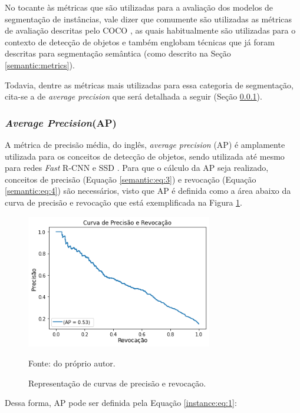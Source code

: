 No tocante às métricas que são utilizadas para a avaliação dos modelos de segmentação de instâncias, vale dizer que comumente são utilizadas as métricas de avaliação descritas pelo COCO \cite{Lin2016}, as quais habitualmente são utilizadas para o contexto de detecção de objetos e também englobam técnicas que já foram descritas para segmentação semântica (como descrito na Seção \ref{semantic:metrics}).

Todavia, dentre as métricas mais utilizadas para essa categoria de segmentação, cita-se a de \textit{average precision} que será detalhada a seguir (Seção \ref{instance:AP}).


\subsubsection{\textit{Average Precision}(AP)}
\label{instance:AP}

A métrica de precisão média, do inglês, \textit{average precision} (AP) é amplamente utilizada para os conceitos de detecção de objetos, sendo utilizada até mesmo para redes \textit{Fast} R-CNN \cite{Girshick2014} e SSD \cite{Liu2015a}. Para que o cálculo da AP seja realizado, conceitos de precisão (Equação \ref{semantic:eq:3}) e revocação (Equação \ref{semantic:eq:4}) são necessários, visto que AP é definida como a área abaixo da curva de precisão e revocação \cite{Hariharan2014} que está exemplificada na Figura \ref{instance:fig:1}.

\begin{figure}[H]
    \centering
    \caption{Representação de curvas de precisão e revocação.}
    \includegraphics[height=2.3in]{recursos/imagens/instance/precisao_revocacao.png}
    \label{instance:fig:1}

    Fonte: do próprio autor.
\end{figure}

Dessa forma, AP pode ser definida pela Equação \ref{instance:eq:1}:


